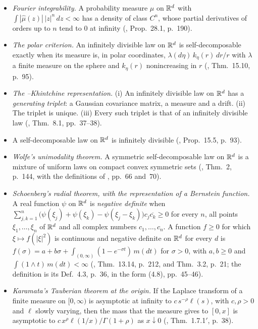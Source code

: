 \begin{itemize}
\setlength{\itemsep}{1pt}
\item[C1] \emph{Fourier integrability.} A probability measure $\mu$ on $\mathbb{R}^d$ with
$\int|\widehat\mu(z)|\,|z|^n\,dz < \infty$ has a density of class $C^n$, whose partial
derivatives of orders up to $n$ tend to $0$ at infinity (, Prop.~28.1,
p.~190).
\item[C2] \emph{The polar criterion.} An infinitely divisible law on $\mathbb{R}^d$ is
self-decomposable exactly when its \Levy{} measure is, in polar coordinates,
$\lambda(d\eta)\,k_\eta(r)\,dr/r$ with $\lambda$ a finite measure on the sphere and $k_\eta(r)$
nonincreasing in $r$ (, Thm.~15.10, p.~95).
\item[C3] \emph{The \Levy--Khintchine representation.} (i) An infinitely divisible law on
$\mathbb{R}^d$ has a \emph{generating triplet}: a Gaussian covariance matrix, a \Levy{} measure and a
drift. (ii) The triplet is unique. (iii) Every such triplet is that of an infinitely divisible
law (, Thm.~8.1, pp.~37--38).
\item[C4] A self-decomposable law on $\mathbb{R}^d$ is infinitely divisible (,
Prop.~15.5, p.~93).
\item[C5] \emph{Wolfe's unimodality theorem.} A symmetric self-decomposable law on $\mathbb{R}^d$ is a
mixture of uniform laws on compact convex symmetric sets (,
Thm.~2, p.~144, with the definitions of , pp.~66 and~70).
\item[C6] \emph{Schoenberg's radial theorem, with the representation of a Bernstein function.}
A real function $\psi$ on $\mathbb{R}^d$ is \emph{negative definite} when
$\sum_{j,k=1}^n\bigl(\psi(\xi_j) + \psi(\xi_k) - \psi(\xi_j - \xi_k)\bigr)c_j\overline{c_k} \ge 0$
for every $n$, all points $\xi_1, \dots, \xi_n$ of $\mathbb{R}^d$ and all complex numbers
$c_1, \dots, c_n$.
A function $f \ge 0$ for which $\xi \mapsto f(|\xi|^2)$ is continuous and negative definite on
$\mathbb{R}^d$ for every $d$ is $f(\sigma) = a + b\sigma + \int_{(0,\infty)}(1 - e^{-\sigma t})\,m(dt)$
for $\sigma > 0$, with $a, b \ge 0$ and $\int(1 \wedge t)\,m(dt) < \infty$
(, Thm.~13.14, p.~212, and Thm.~3.2, p.~21; the definition is
its Def.~4.3, p.~36, in the form (4.8), pp.~45--46).
\item[C7] \emph{Karamata's Tauberian theorem at the origin.} If the Laplace transform of a
finite measure on $[0,\infty)$ is asymptotic at infinity to $c\,s^{-\rho}\ell(s)$, with
$c, \rho > 0$ and $\ell$ slowly varying, then the mass that the measure gives to $[0,x]$ is
asymptotic to $c\,x^{\rho}\ell(1/x)/\Gamma(1+\rho)$ as $x \downarrow 0$
(, Thm.~1.7.1$'$, p.~38).
\end{itemize}
